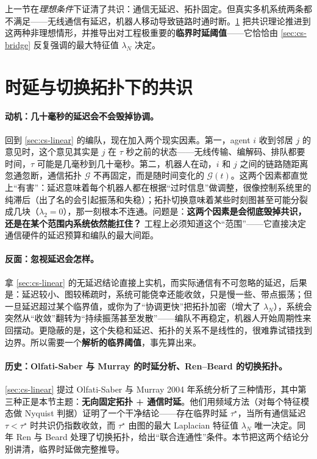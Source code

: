 \noindent 上一节在\emph{理想条件}下证清了共识：通信无延迟、拓扑固定。但真实多机系统两条都不满足——无线通信有延迟，机器人移动导致链路时通时断。\cref{sec:cs-delay} 把共识理论推进到这两种非理想情形，并推导出对工程极重要的\textbf{临界时延阈值}——它恰恰由 \cref{sec:cs-bridge} 反复强调的最大特征值 $\lambda_N$ 决定。

\section{时延与切换拓扑下的共识}
\label{sec:cs-delay}

\paragraph{动机：几十毫秒的延迟会不会毁掉协调。}
回到 \cref{sec:cs-linear} 的编队，现在加入两个现实因素。第一，agent $i$ 收到邻居 $j$ 的意见时，这个意见其实是 $j$ 在 $\tau$ 秒之前的状态——无线传输、编解码、排队都要时间，$\tau$ 可能是几毫秒到几十毫秒。第二，机器人在动，$i$ 和 $j$ 之间的链路随距离忽通忽断，通信拓扑 $\mathcal{G}$ 不再固定，而是随时间变化的 $\mathcal{G}(t)$。这两个因素都直觉上“有害”：延迟意味着每个机器人都在根据“过时信息”做调整，很像控制系统里的纯滞后（出了名的会引起振荡和失稳）；拓扑切换意味着某些时刻图甚至可能分裂成几块（$\lambda_2=0$），那一刻根本不连通。问题是：\textbf{这两个因素是会彻底毁掉共识，还是在某个范围内系统依然能扛住？} 工程上必须知道这个“范围”——它直接决定通信硬件的延迟预算和编队的最大间距。

\paragraph{反面：忽视延迟会怎样。}
拿 \cref{sec:cs-linear} 的无延迟结论直接上实机，而实际通信有不可忽略的延迟，后果是：延迟较小、图较稀疏时，系统可能侥幸还能收敛，只是慢一些、带点振荡；但一旦延迟超过某个临界值，或你为了“协调更快”把拓扑加密（增大了 $\lambda_N$），系统会突然从“收敛”翻转为“持续振荡甚至发散”——编队不再稳定，机器人开始周期性来回摆动。更隐蔽的是，这个失稳和延迟、拓扑的关系不是线性的，很难靠试错找到边界。所以需要一个\textbf{解析的临界阈值}，事先算出来。

\paragraph{历史：Olfati-Saber 与 Murray 的时延分析、Ren--Beard 的切换拓扑。}
\cref{sec:cs-linear} 提过 Olfati-Saber 与 Murray 2004 年系统分析了三种情形\cite{olfatisaber2004consensus}，其中第三种正是本节主题：\textbf{无向固定拓扑 + 通信时延}。他们用频域方法（对每个特征模态做 Nyquist 判据）证明了一个干净结论——存在临界时延 $\tau^\star$，当所有通信延迟 $\tau<\tau^\star$ 时共识仍指数收敛，而 $\tau^\star$ 由图的最大 Laplacian 特征值 $\lambda_N$ 唯一决定。同年 Ren 与 Beard 处理了切换拓扑，给出“联合连通性”条件\cite{renbeard2005consensus}。本节把这两个结论分别讲清，临界时延做完整推导。

